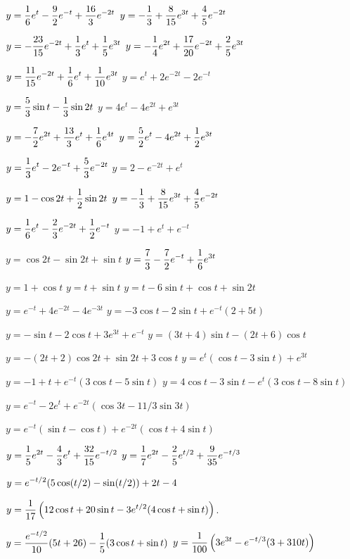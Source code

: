 \medskip

 $y=\displaystyle{\frac{1}{6}e^{t}-\frac{9}{2}e^{-t}+\frac{16}{3}e^{-2t}}$
  $y=\displaystyle{-\frac{1}{3}+\frac{8}{15}e^{3t}+\frac{4}{5}e^{-2t}}$

  $y=\displaystyle{-\frac{23}{15}e^{-2t}+\frac{1}{3}e^{t}
+\frac{1}{5}e^{3t}}$
  $y=\displaystyle{-\frac{1}{4}e^{2t}+\frac{17}{20}e^{-2t}+\frac{2}{5}e^{3t}}$

  $y=\displaystyle{\frac{11}{15}e^{-2t}+\frac{1}{6}e^{t}+\frac{1}{10}e^{3t}}$
  $y=e^{t}+2e^{-2t}-2e^{-t}$

  $y=\displaystyle{\frac{5}{3}\sin t-\frac{1}{3}\sin2t}$
  $y=4e^{t}-4e^{2t}+e^{3t}$

  $y=\displaystyle{-\frac{7}{2}e^{2t}+\frac{13}{3}e^{t}+\frac{1}{6}e^{4t}}$
  $y=\displaystyle{\frac{5}{2}e^{t}-4e^{2t}+\frac{1}{2}e^{3t}}$

  $y=\displaystyle{\frac{1}{3}e^{t}-2e^{-t}+\frac{5}{3}e^{-2t}}$
  $y=2-e^{-2t}+e^{t}$

  $y=\displaystyle{1-\cos2t+\frac{1}{2}\sin2t}$
  $y=\displaystyle{-\frac{1}{3}+\frac{8}{15}e^{3t}
+\frac{4}{5}e^{-2t}}$

  $y=\displaystyle{\frac{1}{6}e^{t}-\frac{2}{3}e^{-2t}+\frac{1}{2}e^{-t}}$
   $y=-1+e^{t}+e^{-t}$

  $y=\cos2t-\sin2t+\sin t$
  $y=\displaystyle{\frac{7}{3}-\frac{7}{2}e^{-t}
+\frac{1}{6}e^{3t}}$

  $y=1+\cos t$
  $y=t+\sin t$
  $y=t-6\sin t+\cos t+\sin2t$

  $y=e^{-t}+4e^{-2t}-4e^{-3t}$
  $y=-3\cos t-2\sin t+e^{-t}(2+5t)$

  $y=-\sin t-2\cos t+3e^{3t}+e^{-t}$
  $y=(3t+4)\sin t-(2t+6)\cos t$

  $y=-(2t+2)\cos2t+\sin2t+3\cos t$
  $y=e^{t}(\cos t-3\sin t)+e^{3t}$

  $y=-1+t+e^{-t}(3\cos t-5\sin t)$
  $y=4\cos t-3\sin t-e^{t}(3\cos t-8\sin t)$

  $y=e^{-t}-2e^{t}+e^{-2t}(\cos3t-{11/3}
\sin3t)$

  $y=e^{-t}(\sin t-\cos t)+e^{-2t}(\cos t
+4\sin t)$

  $y=\displaystyle{\frac{1}{5}e^{2t}-\frac{4}{3}e^{t}
+\frac{32}{15}e^{-t/2}}$
  $y=\displaystyle{\frac{1}{7}e^{2t}-\frac{2}{5}e^{t/2}+\frac{9}{35}e^{-t/3}}$

$y=\displaystyle{e^{-t/2}(5\cos(t/2)-\sin(t/2))+2t-4}$

$y=\displaystyle\frac{1}{17}\left(12\cos t+20\sin t-3e^{t/2}(4\cos t+\sin t
)\right)$.

 $y=\displaystyle{\frac{e^{-t/2}}{10}(5t+26)-\frac{1}{5}(3\cos
t+\sin t)}$
$y=\displaystyle\frac{1}{100}\left(3e^{3t}-e^{-t/3}(3+310t)\right)$


